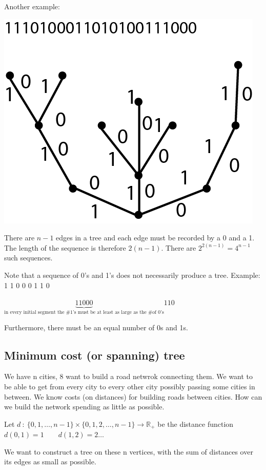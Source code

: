 \documentclass[9pt, letterpaper, oneside]{article}
\begin{document}
Another example:

\includegraphics{fig7.png}

There are $n-1$ edges in a tree and each edge must be recorded by a 0 and a 1. The length of the sequence is therefore $2(n-1)$. There are $2^{2(n-1)} = 4^{n-1}$ such sequences.

Note that a sequence of 0's and 1's does not necessarily produce a tree. Example: 1 1 0 0 0 1 1 0

$\underbrace{11000}_{\text{in every initial segment the \# 1's must be at least as large as the \# of 0's}}110$

Furthermore, there must be an equal number of 0s and 1s.

\subsection{Minimum cost (or spanning) tree}

We have n cities, 8 want to build a road netwrok connecting them. We want to be able to get from every city to every other city possibly passing some cities in between. We know costs (on distances) for building roads between cities. How can we build the network spending as little as possible.

Let $d \ : \ \{0,1,\ldots,n-1\} \times \{0,1,2,\ldots,n-1\} \to \mathbb{R}_+$ be the distance function $d(0,1) = 1 \qquad d(1,2) = 2 \ldots$

We want to construct a tree on these n vertices, with the sum of distances over its edges as small as possible.
\end{document}
